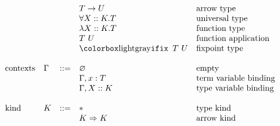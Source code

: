\begin{figure}[!t]
\begin{displaymath}
\begin{array}{lllll}
                    &        &     & T -> U                      & \textrm{arrow type}\\
                    &        &     & \forall X :: K. T           & \textrm{universal type}\\
                    &        &     & \lambda X :: K. T           & \textrm{function type}\\
                    &        &     & T ~ U                       & \textrm{function application}\\
                    &        &     & \fomfDiff{\ifix ~ T ~ U}    & \textrm{fixpoint type}\\
                    &        &     &                             &   \\
  \textrm{contexts} & \Gamma & ::= & \varnothing                 & \textrm{empty}\\
                    &        &     & \Gamma, x:T                 & \textrm{term variable binding}\\
                    &        &     & \Gamma, X::K                & \textrm{type variable binding}\\
                    &        &     &                             &    \\
  \textrm{kind}     & K      & ::= & \Type                       & \textrm{type kind}\\
                    &        &     & K \kindArrow K              & \textrm{arrow kind}\\
  \end{array}
  \end{displaymath}

  \label{fig:fir_syntax}
\end{figure}
